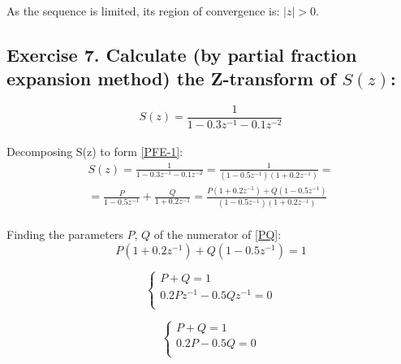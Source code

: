 \documentclass[14pt]{article}
\begin{document}
\paragraph{}
As the sequence is limited, its region of convergence is: 
	$ |z| > 0 $.

\subsection{Exercise 7. Calculate (by partial fraction expansion
	method) the Z-transform of $ S(z) $:}
\begin{equation}
	S(z)
	=
	\frac{1}{1 - 0.3 z^{-1} - 0.1 z^{-2}}
\end{equation}

\paragraph{}
Decomposing S(z) to form \eqref{PFE-1}:
\begin{multline} \label{PQ}
	S(z)
	=
	\frac{1}{1 - 0.3 z^{-1} - 0.1 z^{-2}}
	=
	\frac{1}{(1 - 0.5 z^{-1})(1 + 0.2 z^{-1})}
	=\\=
	\frac{P}{1 - 0.5 z^{-1}} + \frac{Q}{1 + 0.2 z^{-1}}
	=
	\frac{P(1 + 0.2 z^{-1}) + Q(1 - 0.5 z^{-1})}{(1 - 0.5 z^{-1})
		(1 + 0.2 z^{-1})}
\end{multline}

\paragraph{}
Finding the parameters $ P $, $ Q $ of the numerator of \eqref{PQ}:
\begin{equation}
	P(1 + 0.2 z^{-1}) + Q(1 - 0.5 z^{-1})
	=
	1
\end{equation}

\begin{equation}
	\left\{  
	\begin{array}{rcl}  
		P + Q = 1\\  
		0.2 P z^{-1} -0.5 Q z^{-1} = 0\\    
	\end{array}
	\right.
\end{equation}

\begin{equation}
	\left\{  
	\begin{array}{rcl}  
		P + Q = 1\\  
		0.2 P - 0.5 Q = 0\\    
	\end{array}
	\right.
\end{equation}
\end{document}
